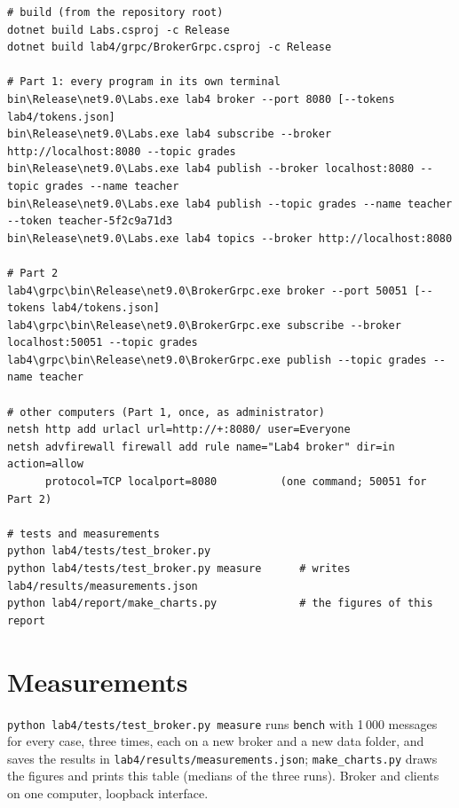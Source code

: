 \documentclass[11pt,a4paper]{article}
\newcommand{\code}[1]{{\frenchspacing\texttt{#1}}}
\begin{document}
\begin{lstlisting}
# build (from the repository root)
dotnet build Labs.csproj -c Release
dotnet build lab4/grpc/BrokerGrpc.csproj -c Release

# Part 1: every program in its own terminal
bin\Release\net9.0\Labs.exe lab4 broker --port 8080 [--tokens lab4/tokens.json]
bin\Release\net9.0\Labs.exe lab4 subscribe --broker http://localhost:8080 --topic grades
bin\Release\net9.0\Labs.exe lab4 publish --broker localhost:8080 --topic grades --name teacher
bin\Release\net9.0\Labs.exe lab4 publish --topic grades --name teacher --token teacher-5f2c9a71d3
bin\Release\net9.0\Labs.exe lab4 topics --broker http://localhost:8080

# Part 2
lab4\grpc\bin\Release\net9.0\BrokerGrpc.exe broker --port 50051 [--tokens lab4/tokens.json]
lab4\grpc\bin\Release\net9.0\BrokerGrpc.exe subscribe --broker localhost:50051 --topic grades
lab4\grpc\bin\Release\net9.0\BrokerGrpc.exe publish --topic grades --name teacher

# other computers (Part 1, once, as administrator)
netsh http add urlacl url=http://+:8080/ user=Everyone
netsh advfirewall firewall add rule name="Lab4 broker" dir=in action=allow
      protocol=TCP localport=8080          (one command; 50051 for Part 2)

# tests and measurements
python lab4/tests/test_broker.py
python lab4/tests/test_broker.py measure      # writes lab4/results/measurements.json
python lab4/report/make_charts.py             # the figures of this report
\end{lstlisting}

\section{Measurements}\label{app:data}

\code{python lab4/tests/test\_broker.py measure} runs \code{bench} with 1\,000 messages for every case,
three times, each on a new broker and a new data folder, and saves the results in
\code{lab4/results/measurements.json}; \code{make\_charts.py} draws the figures and prints this table
(medians of the three runs). Broker and clients on one computer, loopback interface.
\end{document}
